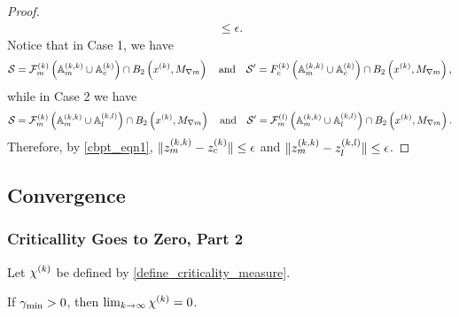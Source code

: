 \begin{proof}
\begin{align*}
\le \epsilon.
\end{align*}
Notice that in Case 1, we have 
\begin{align*}
\mathcal S  = {\mathcal F_m^{(k)}}\left({\mathbb A_m^{(k, k)}} \cup {\mathbb A_c^{(k)}} \right) \cap B_2\left(x^{(k)}, {M_{\nabla m}}\right) \quad \textrm{and} \quad
\mathcal S' = {F_c^{(k)}}\left({\mathbb A_m^{(k, k)}} \cup {\mathbb A_c^{(k)}} \right) \cap B_2\left(x^{(k)}, {M_{\nabla m}}\right), 
\end{align*}
while in Case 2 we have 
\begin{align*}
\mathcal S  = {\mathcal F_m^{(k)}}\left({\mathbb A_m^{(k, k)}} \cup {\mathbb A_l^{(k, l)}}\right) \cap B_2\left(x^{(k)}, {M_{\nabla m}}\right) \quad \textrm{and} \quad
\mathcal S' = {\mathcal F_m^{(l)}}\left({\mathbb A_m^{(k, k)}} \cup {\mathbb A_l^{(k, l)}} \right) \cap B_2\left(x^{(k)}, {M_{\nabla m}}\right).
\end{align*}
Therefore, by \cref{cbpt_eqn1}, $\|{z_m^{(k, k)}} - {z_c^{(k)}}\| \le \epsilon$ and $\|{z_m^{(k, k)}} - {z_l^{(k, l)}}\| \le \epsilon$.
\end{proof}


\subsection{Convergence}
\label{convergence_section}


\subsubsection{Criticallity Goes to Zero, Part 2}
\label{limit_of_criticallity_to_zero}


\begin{lemma}
\label{lim_chi_to_zero}
Let ${\chi^{(k)}}$ be defined by \cref{define_criticality_measure}.



If $\gamma_{\textrm{min}} > 0$, then $\lim_{k\to\infty}{\chi^{(k)}}=0$.
\end{lemma}


